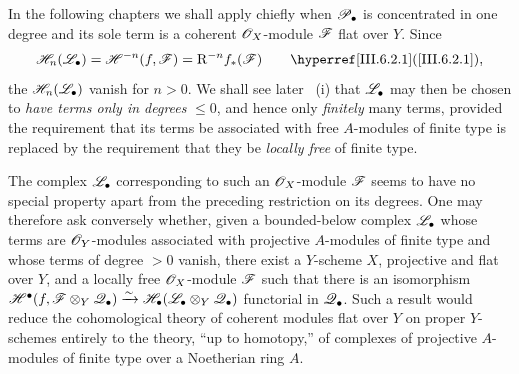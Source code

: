 \begin{remark}[6.10.6]
\label{III.6.10.6}
In the following chapters we shall apply 
chiefly when $\mathscr{P}_\bullet$ is concentrated in one degree and
its sole term is a coherent $\mathscr{O}_X$-module $\mathscr{F}$ flat over
$Y$.  Since
\[
  \sh H_n(\sh L_\bullet)
  =
  \sh H^{-n}(f,\sh F)
  =
  \mathrm R^{-n}f_*(\sh F)
  \qquad\text{\sref{III.6.2.1}},
\]
the $\mathscr{H}_n(\mathscr{L}_\bullet)$ vanish for $n>0$.  We shall see
later ~(i) that $\mathscr{L}_\bullet$ may then be
chosen to \emph{have terms only in degrees} $\leq0$, and hence only
\emph{finitely} many terms, provided the requirement that its terms
be associated with free $A$-modules of finite type is replaced
by the requirement that they be \emph{locally free} of finite type.

The complex $\mathscr{L}_\bullet$ corresponding to such an
$\mathscr{O}_X$-module $\mathscr{F}$ seems to have no special property
apart from the preceding restriction on its degrees.  One may
therefore ask conversely whether, given a bounded-below complex
$\mathscr{L}_\bullet$ whose terms are $\mathscr{O}_Y$-modules associated
with projective $A$-modules of finite type and whose terms of
degree $>0$ vanish, there exist a $Y$-scheme $X$, projective and
flat over $Y$, and a locally free $\mathscr{O}_X$-module $\mathscr{F}$ such
that there is an isomorphism $\mathscr{H}^\bullet
(f,\mathscr{F}\otimes_Y\mathscr{Q}_\bullet)
\xrightarrow{\sim}
\mathscr{H}_\bullet
(\mathscr{L}_\bullet\otimes_Y\mathscr{Q}_\bullet)$
functorial in $\mathscr{Q}_\bullet$.  Such a result would reduce the
cohomological theory of coherent modules flat over $Y$ on
proper $Y$-schemes entirely to the theory, ``up to homotopy,''
of complexes of projective $A$-modules of finite type over a
Noetherian ring $A$.
\end{remark}
